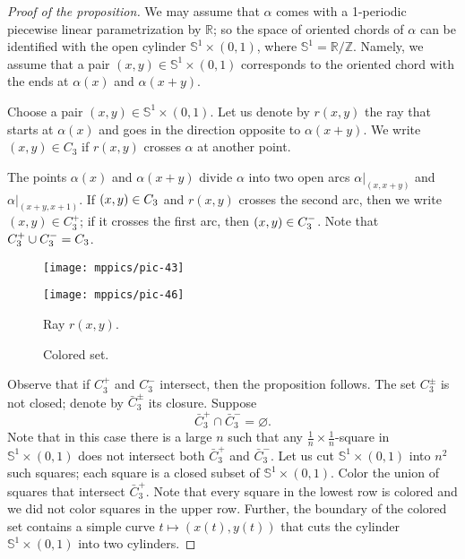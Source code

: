\documentclass{article}
\newcommand*{\z}[1]{#1\nobreak\discretionary{}%
            {\hbox{$\mathsurround=0pt #1$}}{}}
\theoremstyle{theorem}
\newtheorem{Crofton-type formula}[theorem]{Crofton-type formula}
\newtheorem{Douglas--Rado theorem}[theorem]{Douglas--Rado theorem}
\newtheorem{Extended monotonicity theorem}[theorem]{Extended monotonicity theorem}
\theoremstyle{definition}
\def\RR{\mathbb{R}}
\def\ZZ{\mathbb{Z}}
\def\emptyset{\varnothing}
\begin{document}
\begin{proof}[Proof of the proposition]
We may assume that $\alpha$ comes with a 1-periodic piecewise linear parametrization by $\RR$;
so the space of oriented chords of $\alpha$ can be identified with the open cylinder $\mathbb{S}^1\times (0,1)$, where $\mathbb{S}^1=\RR/\ZZ$.
Namely, we assume that a pair $(x,y)\in \mathbb{S}^1\times (0,1)$ corresponds to the oriented chord with the ends at $\alpha(x)$ and $\alpha(x+y)$.

Choose a pair $(x,y)\in \mathbb{S}^1\times (0,1)$.
Let us denote by $r(x,y)$ the ray that starts at $\alpha(x)$ and goes in the direction opposite to $\alpha(x+y)$.
We write $(x,y)\in C_3$ if $r(x,y)$ crosses $\alpha$ at another point.

The points $\alpha(x)$ and $\alpha(x+y)$ divide $\alpha$ into two open arcs $\alpha|_{(x,x+y)}$ and $\alpha|_{(x+y,x+1)}$.
If $(x,y)\z\in C_3$ and $r(x,y)$ crosses the second arc, then we write $(x,y)\in C_3^+$;
if it crosses the first arc, then $(x,y)\z\in C_3^-$.
Note that $C_3^+\cup C_3^-\z=C_3$.

\begin{figure}[!ht]
\begin{minipage}{.48\textwidth}
\centering
\texttt{[image: mppics/pic-43]}
\end{minipage}\hfill
\begin{minipage}{.48\textwidth}
\centering
\texttt{[image: mppics/pic-46]}
\end{minipage}

\medskip

\begin{minipage}{.48\textwidth}
\centering
\caption{Ray $r(x,y)$.}
\end{minipage}\hfill
\begin{minipage}{.48\textwidth}
\centering
\caption{Colored set.}
\end{minipage}
\vskip-0mm
\end{figure}

Observe that if $C_3^+$ and $C_3^-$ intersect, then the proposition follows.
The set $C_3^\pm$ is not closed;
denote by $\bar C_3^\pm$ its closure.
Suppose 
\[\bar C_3^+\cap \bar C_3^-=\emptyset.\]
Note that in this case there is a large $n$ such that any $\tfrac1n\times\tfrac1n$-square in $\mathbb{S}^1\times (0,1)$ does not intersect both $\bar C_3^+$ and $\bar C_3^-$.
Let us cut $\mathbb{S}^1\times (0,1)$ into $n^2$ such squares; each square is a closed subset of $\mathbb{S}^1\times (0,1)$.
Color the union of squares that intersect $\bar C_3^+$.
Note that every square in the lowest row is colored and we did not color squares in the upper row.
Further, the boundary of the colored set contains a simple curve $t\mapsto(x(t),y(t))$ that cuts  the cylinder $\mathbb{S}^1\times (0,1)$ into two cylinders.


\end{proof}
\end{document}
